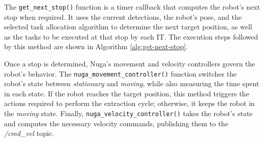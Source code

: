 The \texttt{get\_next\_stop()} function is a timer callback that computes the robot's next stop when required. It uses the current detections, the robot's pose, and the selected task allocation algorithm to determine the next target position, as well as the tasks to be executed at that stop by each \ac{IT}. The execution steps followed by this method are shown in Algorithm \ref{alg:get-next-stop}.

Once a stop is determined, Nuga’s movement and velocity controllers govern the robot’s behavior. The \texttt{nuga\_movement\_controller()} function switches the robot’s state between \textit{stationary} and \textit{moving}, while also measuring the time spent in each state. If the robot reaches the target position, this method triggers the actions required to perform the extraction cycle; otherwise, it keeps the robot in the \textit{moving} state. Finally, \texttt{nuga\_velocity\_controller()} takes the robot’s state and computes the necessary velocity commands, publishing them to the \textit{/cmd\_vel} topic.



